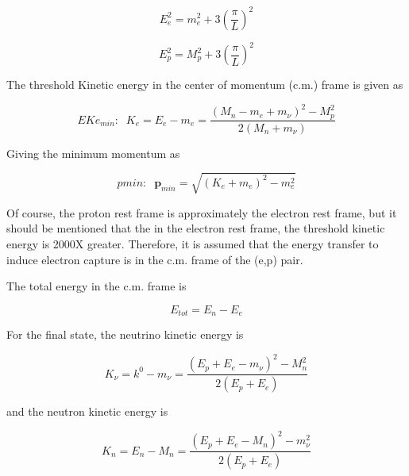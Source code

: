 \documentclass[11pt]{amsart}
\begin{document}
$$E^{2}_{e}=m^{2}_{e}+3\left(\dfrac{\pi}{L}\right)^{2}$$ 

$$E^{2}_{p}=M^{2}_{p}+3\left(\dfrac{\pi}{L}\right)^{2}$$

The threshold Kinetic energy in the center of momentum (c.m.) frame is given as

$$EKe_{min}:\;\;K_{e}=E_{e}-m_{e}=\dfrac{(M_{n}-m_{e}+m_{\nu})^{2}-M^{2}_{p}}{2(M_{n}+m_{\nu})}$$
 
Giving the minimum momentum as

$$pmin:\;\;\mathbf{p}_{min}=\sqrt{(K_{e}+m_{e})^{2}-m_{e}^{2}} $$

Of course, the proton rest frame is approximately the electron rest frame, but it should be mentioned that the in the electron rest frame, the threshold kinetic energy is 2000X greater.  Therefore, it is assumed that the energy transfer to induce electron capture is in the c.m. frame of the (e,p) pair.

The total energy in the c.m. frame is

$$E_{tot}=E_{n}-E_{e}$$

For the final state, the neutrino kinetic energy is

$$K_{\nu}=k^{0}-m_{\nu}=\dfrac{(E_{p}+E_{e}-m_{\nu})^{2}-M^{2}_{n}}{2(E_{p}+E_{e})}$$

and the neutron kinetic energy is

$$K_{n}=E_{n}-M_{n}=\dfrac{(E_{p}+E_{e}-M_{n})^{2}-m^{2}_{\nu}}{2(E_{p}+E_{e})}$$
\end{document}
